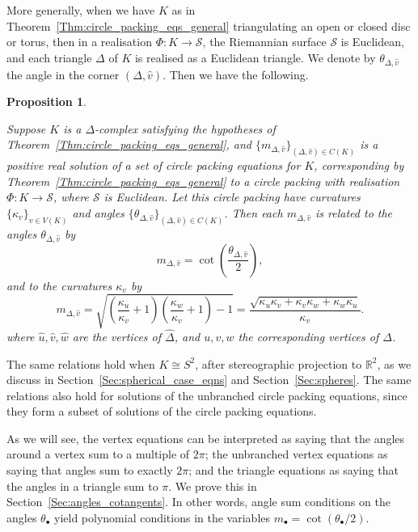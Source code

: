 \documentclass[12pt]{amsart}
\numberwithin{equation}{section}
\newtheorem{prop}[equation]{Proposition}
\theoremstyle{named}
\newcommand{\refsec}[1]{Section~\ref{Sec:#1}}
\newcommand{\refthm}[1]{Theorem~\ref{Thm:#1}}
\newcommand{\R}{\mathbb{R}}
\newcommand{\To}{\longrightarrow}
\begin{document}
More generally, when we have $K$ as in \refthm{circle_packing_eqs_general} triangulating an open or closed disc or torus, then in a realisation $\Phi \colon K \To \mathcal{S}$, the Riemannian surface $\mathcal{S}$ is Euclidean, and each triangle $\Delta$ of $K$ is realised as a Euclidean triangle. We denote by $\theta_{\Delta,\widehat{v}}$ the angle in the corner $(\Delta, \widehat{v})$. Then we have the following.
\begin{prop}
\label{Prop:m_meaning}
 
Suppose $K$ is a $\Delta$-complex satisfying the hypotheses of \refthm{circle_packing_eqs_general}, and $\{m_{\Delta,\widehat{v}}\}_{(\Delta,\widehat{v}) \in C(K)}$ is a positive real solution of a set of circle packing equations for $K$, corresponding by \refthm{circle_packing_eqs_general} to a circle packing with realisation $\Phi \colon K \To \mathcal{S}$, where $\mathcal{S}$ is Euclidean. Let this circle packing have curvatures $\{\kappa_v\}_{v \in V(K)}$ and angles $\{\theta_{\Delta,\widehat{v}}\}_{(\Delta,\widehat{v}) \in C(K)}$. Then each $m_{\Delta,\widehat{v}}$ is related to the angles $\theta_{\Delta,\widehat{v}}$ by
\[
 m_{\Delta,\widehat{v}}
 = \cot \left( \frac{ \theta_{\Delta,\widehat{v}} } {2} \right),
\]
and to the curvatures $\kappa_v$ by
\begin{equation}
\label{Eqn:ms_in_terms_of_ks}
 m_{\Delta,\widehat{v}} = \sqrt{ \left( \frac{\kappa_u}{\kappa_v} + 1 \right) \left( \frac{\kappa_w}{\kappa_v} + 1 \right) - 1}
= \frac{\sqrt{\kappa_u \kappa_v + \kappa_v \kappa_w + \kappa_w \kappa_u}}{\kappa_v}.
\end{equation}
where $\widehat{u},\widehat{v},\widehat{w}$ are the vertices of $\widehat{\Delta}$, and $u,v,w$ the corresponding vertices of $\Delta$.
\end{prop}
 The same relations hold when $K \cong S^2$, after stereographic projection to $\R^2$, as we discuss in \refsec{spherical_case_eqns} and \refsec{spheres}.
The same relations also hold for solutions of the unbranched circle packing equations, since they form a subset of solutions of the circle packing equations.

As we will see, the vertex equations can be interpreted as saying that the angles around a vertex sum to a multiple of $2\pi$; the unbranched vertex equations as saying that angles sum to exactly $2\pi$; and the triangle equations as saying that the angles in a triangle sum to $\pi$. We prove this in \refsec{angles_cotangents}. In other words, angle sum conditions on the angles $\theta_\bullet$ yield polynomial conditions in the variables $m_\bullet = \cot(\theta_\bullet/2)$.
\end{document}
